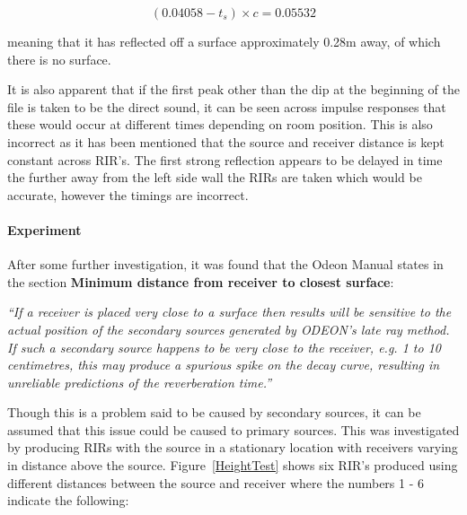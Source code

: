 \documentclass[../../main.tex]{subfiles}
\begin{document}
			\begin{equation}
			(0.04058 - t_s)\times{c} = 0.05532
			\end{equation}

			meaning that it has reflected off a surface approximately 0.28m away, of which there is no surface.

			It is also apparent that if the first peak other than the dip at the beginning of the file is taken to be the direct sound, it can be seen across impulse responses that these would occur at different times depending on room position. This is also incorrect as it has been mentioned that the source and receiver distance is kept constant across \ac{RIR}’s. The first strong reflection appears to be delayed in time the further away from the left side wall the RIRs are taken which would be accurate, however the timings are incorrect.

			\paragraph{Experiment}
			After some further investigation, it was found that the Odeon Manual \cite{odeonManual} states in the section \textbf{Minimum distance from receiver to closest surface}:

			 \vspace{5mm}
			 \begin{center}
			 \begin{minipage}{0.75\textwidth}
			 \textit{``If a receiver is placed very close to a surface then results will be sensitive to the actual position of the secondary sources generated by ODEON’s late ray method. If such a secondary source happens to be very close to the receiver, e.g. 1 to 10 centimetres, this may produce a spurious spike on the decay curve, resulting in unreliable predictions of the reverberation time.''}
			 \end{minipage}
			 \end{center}
			 \vspace{5mm}

			 Though this is a problem said to be caused by secondary sources, it can be assumed that this issue could be caused to primary sources. This was investigated by producing RIRs with the source in a stationary location with receivers varying in distance above the source. Figure~\ref{HeightTest} shows six \ac{RIR}'s produced using different distances between the source and receiver where the numbers 1 - 6 indicate the following:
\end{document}
